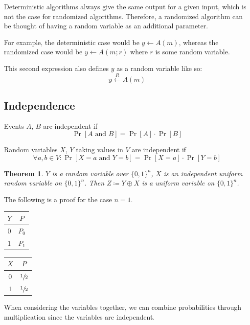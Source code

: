 \documentclass[10pt,a4paper]{report}
\newtheorem{theorem}{Theorem}[section]
\begin{document}
Deterministic algorithms always give the same output for a given input, which is not the case for
randomized algorithms. Therefore, a randomized algorithm can be thought of having a random variable
as an additional parameter.

For example, the deterministic case would be $y \leftarrow A(m)$, whereas the randomized case would
be $y \leftarrow A(m; r)$ where $r$ is some random variable.

This second expression also defines $y$ as a random variable like so:
    $$ y \xleftarrow{R} A(m) $$

\subsection{Independence}

Events $A$, $B$ are independent if
    $$\operatorname{Pr}[A \text{ and } B] = \operatorname{Pr}[A] \cdot \operatorname{Pr}[B]$$

Random variables $X$, $Y$ taking values in $V$ are independent if
    $$\forall a, b \in V \colon \operatorname{Pr}[X = a \text{ and } Y = b] = \operatorname{Pr}[X =
      a] \cdot \operatorname{Pr}[Y = b] $$

\begin{theorem}
    $Y$ is a random variable over $\{0, 1\}^n$, $X$ is an independent uniform random variable on
    $\{0, 1\}^n$. Then $Z \coloneqq Y \oplus X$ is a uniform variable on $\{0, 1\}^n$.
\end{theorem}

The following is a proof for the case $n = 1$.

\begin{table}[H]
    \centering
    \begin{tabular}{c|c}
        $Y$ & $P$\\
        \hline
        $0$ & $P_0$\\
        $1$ & $P_1$\\
    \end{tabular}
    \quad  %
    \begin{tabular}{c|c}
        $X$ & $P$\\
        \hline
        $0$ & $\sfrac{1}{2}$\\
        $1$ & $\sfrac{1}{2}$\\
    \end{tabular}
\end{table}

When considering the variables together, we can combine probabilities through multiplication since
the variables are independent.
\end{document}
